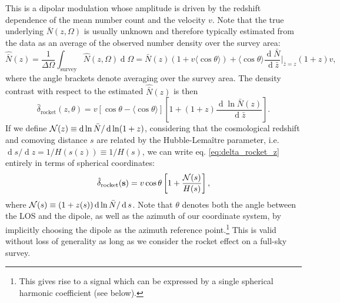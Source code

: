 \documentclass[a4paper,11pt]{article}
\renewcommand{\d}{\operatorname{d}}
\begin{document}
This is a dipolar modulation whose amplitude is driven by the redshift dependence of the mean number count and the velocity $v$. Note that the true underlying $\bar N(z,\Omega)$ is usually unknown and therefore typically estimated from the data as an average of the observed number density over the survey area:
\begin{equation}
    \hat{\bar N}(z) = \frac{1}{\Delta\Omega}\int_\mathrm{survey}\hat N( z,\Omega)\d\Omega = \bar N(z)\left(1 + v \langle \cos\theta\rangle\right) + \langle \cos\theta\rangle \frac{\d\bar N}{\d\bar z}\Big|_{\bar z=z}(1+z)v,
\end{equation}
where the angle brackets denote averaging over the survey area. The density contrast with respect to the estimated $\hat{\bar N}(z)$ is then 
\begin{equation}
    \hat\delta_\mathrm{rocket}(z,\theta)=v\left[\cos\theta - \langle\cos\theta\rangle\right]\left[ 1 + (1+z)\frac{\d \ln\bar N(z)}{\d\bar z}\right].
    \label{eq:delta_rocket_z_partial_sky}
\end{equation}
If we define ${\cal N}(z)\equiv \d\ln \bar{N}/\d\ln(1+z)$, 
considering that the cosmological redshift and comoving distance $s$ are related by the Hubble-Lema\^itre parameter, i.e. $\d s/ \d z=1/H(s(z)) \equiv 1/H(s)$, we can write eq. \eqref{eq:delta_rocket_z} entirely in terms of spherical coordinates:
\begin{equation}
    \hat\delta_\mathrm{rocket}(\mathbf{s})=v\cos\theta \left[ 1  + \frac{{\cal N}(s)}{H(s)}\right],
    \label{eq:delta_rocket_distance}
\end{equation}
where ${\cal N}(s)\equiv (1+z(s)) \d\ln \bar N/\d s$.
Note that $\theta$ denotes both the angle between the LOS and the dipole, as well as the azimuth of our coordinate system, by implicitly choosing the dipole as the azimuth reference point.\footnote{This gives rise to a signal which can be expressed by a single spherical harmonic coefficient (see below). 
}
This is valid without loss of generality as long as we consider the rocket effect on a full-sky survey.
\end{document}
